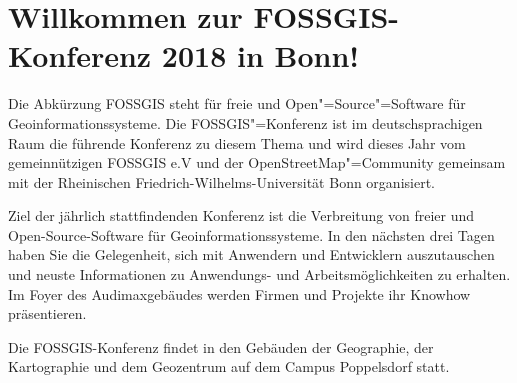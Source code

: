 \newpage
\section*{Willkommen zur FOSSGIS-Konferenz 2018 in Bonn!} \label{welcome}
Die Abkürzung FOSSGIS steht
für freie und Open"=Source"=Software für Geoinformationssysteme.
Die FOSSGIS"=Konferenz ist im deutschsprachigen Raum die führende Konferenz zu diesem Thema
und wird dieses Jahr vom gemeinnützigen FOSSGIS e.V und der OpenStreetMap"=Community
gemeinsam mit der Rheinischen Friedrich-Wilhelms-Universität Bonn organisiert.

Ziel der jährlich stattfindenden Konferenz ist die Verbreitung von freier und
Open-Source-Software für Geoinformationssysteme.  In den nächsten drei Tagen
haben Sie die Gelegenheit, sich mit Anwendern und Entwicklern auszutauschen und
neuste Informationen zu Anwendungs- und Arbeitsmöglichkeiten zu erhalten. Im
Foyer des Audimaxgebäudes werden Firmen und Projekte ihr Knowhow präsentieren.

Die FOSSGIS-Konferenz findet in den Gebäuden der Geographie, der Kartographie und dem Geozentrum auf dem Campus Poppelsdorf statt.

\newpage
% 
